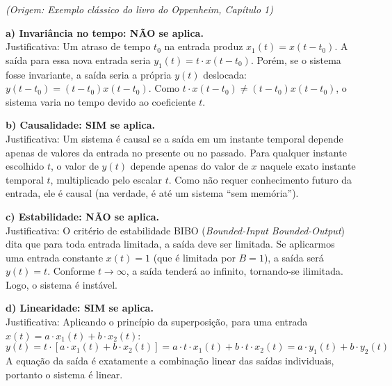 \emph{(Origem: Exemplo clássico do livro do Oppenheim, Capítulo 1)}

\textbf{a) Invariância no tempo: NÃO se aplica.}\\
Justificativa: Um atraso de tempo \(t_0\) na entrada produz \(x_1(t) = x(t-t_0)\). A saída para essa nova entrada seria \(y_1(t) = t \cdot x(t-t_0)\). Porém, se o sistema fosse invariante, a saída seria a própria \(y(t)\) deslocada: \(y(t-t_0) = (t-t_0)x(t-t_0)\). Como \(t \cdot x(t-t_0) \neq (t-t_0)x(t-t_0)\), o sistema varia no tempo devido ao coeficiente \(t\).

\textbf{b) Causalidade: SIM se aplica.}\\
Justificativa: Um sistema é causal se a saída em um instante temporal depende apenas de valores da entrada no presente ou no passado. Para qualquer instante escolhido \(t\), o valor de \(y(t)\) depende apenas do valor de \(x\) naquele exato instante temporal \(t\), multiplicado pelo escalar \(t\). Como não requer conhecimento futuro da entrada, ele é causal (na verdade, é até um sistema ``sem memória'').

\textbf{c) Estabilidade: NÃO se aplica.}\\
Justificativa: O critério de estabilidade BIBO (\emph{Bounded-Input Bounded-Output}) dita que para toda entrada limitada, a saída deve ser limitada. Se aplicarmos uma entrada constante \(x(t) = 1\) (que é limitada por \(B=1\)), a saída será \(y(t) = t\). Conforme \(t \to \infty\), a saída tenderá ao infinito, tornando-se ilimitada. Logo, o sistema é instável.

\textbf{d) Linearidade: SIM se aplica.}\\
Justificativa: Aplicando o princípio da superposição, para uma entrada \(x(t) = a \cdot x_1(t) + b \cdot x_2(t)\):
\[y(t) = t \cdot [a \cdot x_1(t) + b \cdot x_2(t)] = a \cdot t \cdot x_1(t) + b \cdot t \cdot x_2(t) = a \cdot y_1(t) + b \cdot y_2(t)\]
A equação da saída é exatamente a combinação linear das saídas individuais, portanto o sistema é linear.
